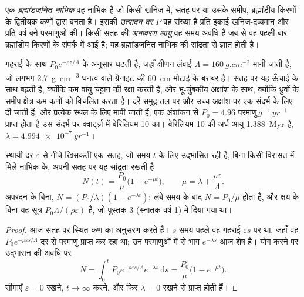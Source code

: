 \begin{definition}
\label{def:b3:advanced-geochronology:cosmogenic}
एक \emph{ब्रह्मांडजनित नाभिक} वह नाभिक है जो
किसी खनिज में, सतह पर या उसके समीप, ब्रह्मांडीय किरणों के द्वितीयक कणों द्वारा बनता है। इसकी
\emph{उत्पादन दर} $P$ वह संख्या है
प्रति इकाई खनिज-द्रव्यमान और प्रति वर्ष बने परमाणुओं की। किसी सतह की \emph{अनावरण
आयु} वह समय-अवधि है जब से वह पहली बार
ब्रह्मांडीय किरणों के संपर्क में आई है; यह ब्रह्मांडजनित नाभिक की सांद्रता से ज्ञात होती है।
\end{definition}

गहराई के साथ  $P_0e^{-\rho z/\Lambda}$ के अनुसार घटती है, जहाँ
क्षीणन लंबाई $\Lambda = \qty{160}{g.cm^{-2}}$ मानी जाती है, जो लगभग
\qty{2.7}{g.cm^{-3}} घनत्व वाले ग्रेनाइट की \qty{60}{cm} मोटाई के बराबर है। सतह पर यह
ऊँचाई के साथ बढ़ती है, क्योंकि कम वायु चट्टान की रक्षा करती है, और
भू-चुंबकीय अक्षांश के साथ, क्योंकि ध्रुवों के समीप क्षेत्र
कम कणों को विचलित करता है। दरें समुद्र-तल पर और उच्च अक्षांश पर एक संदर्भ के लिए दी जाती हैं, और
प्रत्येक स्थल के लिए मापी जाती हैं; एक अंशांकन से $P_0 = \num{4.96}\text{ परमाणु}\,\unit{g^{-1}.yr^{-1}}$ प्राप्त होता है
उस संदर्भ पर क्वार्ट्ज़ में बेरिलियम-10 का। बेरिलियम-10 की अर्ध-आयु
\qty{1.388}{Myr} है, $\lambda = \qty{4.994e-7}{yr^{-1}}$।

\begin{theorem}[क्षय और अपरदन के साथ उद्भासन]\label{thm:b3:advanced-geochronology:exposure}
स्थायी दर $\varepsilon$ से नीचे खिसकती एक सतह, जो समय $t$ के लिए उद्भासित रही है,
बिना किसी विरासत में मिले नाभिक के, अपनी सतह पर यह सांद्रता रखती है
\[
N(t) = \frac{P_0}{\mu}\bigl(1 - e^{-\mu t}\bigr), \qquad
\mu = \lambda + \frac{\rho\varepsilon}{\Lambda}.
\]
अपरदन के बिना, $N = (P_0/\lambda)(1 - e^{-\lambda t})$; लंबे समय के बाद
$N = P_0/\mu$ होता है, और क्षय के बिना यह सूत्र $P_0\Lambda/(\rho\varepsilon)$ है,
जो पुस्तक 3 (स्नातक वर्ष 1) में दिया गया था।
\end{theorem}

\begin{proof}
आज सतह पर स्थित कण का अनुसरण करते हैं। $s$ समय पहले वह
गहराई $\varepsilon s$ पर था, जहाँ वह $P_0e^{-\rho\varepsilon
s/\Lambda}$ दर से परमाणु प्राप्त कर रहा था; उन परमाणुओं में से भाग $e^{-\lambda s}$ आज शेष है। योग करने पर
उद्भासन की अवधि पर
\[
N = \int_0^t P_0e^{-\rho\varepsilon s/\Lambda}e^{-\lambda s}\,\mathrm ds
= \frac{P_0}{\mu}\bigl(1 - e^{-\mu t}\bigr).
\]
सीमाएँ $\varepsilon = 0$ रखने, $t \to \infty$ करने, और
फिर $\lambda = 0$ रखने से प्राप्त होती हैं।
\end{proof}

